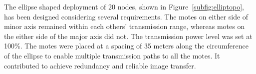 \documentclass[conference,final]{IEEEtran}
\newcommand{\notedme}[1]{\raisebox{0pt}[0pt][0pt]{\pdfcomment[open=true,color=blue]{#1}}}
\begin{document}


The ellipse shaped deployment of 20 nodes, shown in Figure~\ref{subfig:elliptopo}, has been designed considering several requirements.
The motes on either side of minor axis remained within each others' transmission range, whereas motes on the either side of the major axis did not.
The transmission power level was set at 100\%. 
The motes were placed at a spacing of 35 meters along the circumference of the ellipse to enable multiple transmission paths to all the motes.
It contributed to achieve  redundancy and  reliable image transfer. 
\end{document}
